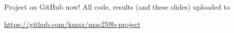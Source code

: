 \documentclass{beamer}
\begin{document}
	\begin{frame}{Project on GitHub now!}
		All code, results (and these slides) uploaded to
		
		\begin{center}
			\url{https://github.com/kmxz/mae259b-project}
			
		\end{center}
	\end{frame}
\end{document}
